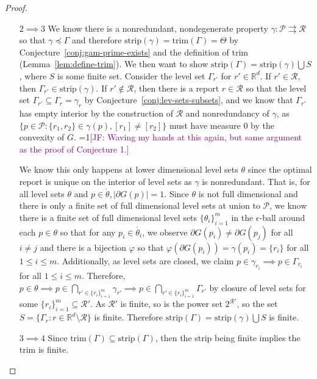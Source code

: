 \documentclass[12pt]{article}
\newcommand{\Comments}{1}
\newcommand{\mynote}[2]{\ifnum\Comments=1\textcolor{#1}{#2}\fi}
\newcommand{\jessie}[1]{\mynote{purple}{[JF: #1]}}
\newcommand{\reals}{\mathbb{R}}
\renewcommand{\P}{\mathcal{P}}
\newcommand{\R}{\mathcal{R}}
\newcommand{\inter}[1]{\mathring{#1}}%
\newcommand{\toto}{\rightrightarrows}
\newcommand{\trim}{\mathrm{trim}}
\newcommand{\strip}{\mathrm{strip}}
\begin{document}
\begin{proof}
\begin{enumerate}
\item [$2 \implies 3$]
	We know there is a nonredundant, nondegenerate property $\gamma : \P \toto \R$ so that $\gamma \preceq \Gamma$ and therefore $\strip(\gamma) = \trim(\Gamma) = \Theta$ by Conjecture~\ref{conj:gam-prime-exists} and the definition of trim (Lemma~\ref{lem:define-trim}).
	We then want to show $\strip(\Gamma) = \strip(\gamma) \bigcup S$, where $S$ is some finite set.
	Consider the level set $\Gamma_{r'}$ for $r' \in \reals^d$.
	If $r' \in \R$, then $\Gamma_{r'} \in \strip(\gamma)$.
	If $r' \not \in \R$, then there is a report $r \in \R$ so that the level set $\Gamma_{r'} \subseteq \Gamma_r = \gamma_r$ by Conjecture~\ref{conj:lev-sets-subsets}, and we know that $\Gamma_{r'}$ has empty interior by the construction of $\R$ and nonredundancy of $\gamma$, as $\{p \in \P: \{r_1, r_2\} \in \gamma(p), [r_1] \neq [r_2] \}$ must have measure $0$ by the convexity of $G$.
	\jessie{Waving my hands at this again, but same argument as the proof of Conjecture 1.}

			
	We know this only happens at lower dimensional level sets $\theta$ since the optimal report is unique on the interior of level sets as $\gamma$ is nonredundant.
	That is, for all level sets $\theta$ and $p \in \inter \theta, |\partial G(p)| = 1$.
	Since $\theta$ is not full dimensional and there is only a finite set of full dimensional level sets at union to $\P$, we know there is a finite set of full dimensional level sets $\{\theta_i\}_{i=1}^m$ in the $\epsilon$-ball around each $p \in \theta$ so that for any $p_i \in \inter{\theta_i}$, we observe $\partial G(p_i) \neq \partial G(p_j)$ for all $i \neq j$ and there is a bijection $\varphi$ so that $\varphi(\partial G(p_i)) = \gamma(p_i) = \{r_i\}$ for all $1 \leq i \leq m$.
	Additionally, as level sets are closed, we claim $p \in \gamma_{r_i} \implies p \in \Gamma_{r_i}$ for all $1 \leq i \leq m$.
	Therefore, $p \in \theta \implies p \in \bigcap_{r' \in \{r_i\}_{i=1}^m} \gamma_{r'}\implies p \in \bigcap_{r' \in \{r_i\}_{i=1}^m} \Gamma_{r'}$ by closure of level sets for some $\{r_i\}_{i=1}^m \subseteq \R'$.
	As $\R'$ is finite, so is the power set $2^{\R'}$, so the set $S = \{\Gamma_r : r \in \reals^d \setminus \R \}$ is finite.
	Therefore $\strip(\Gamma) = \strip(\gamma) \bigcup S$ is finite. 
		

\item [$3 \implies 4$]
Since $\trim(\Gamma) \subseteq \strip(\Gamma)$, then the strip being finite implies the trim is finite.


\end{enumerate} 

\end{proof}
\end{document}
